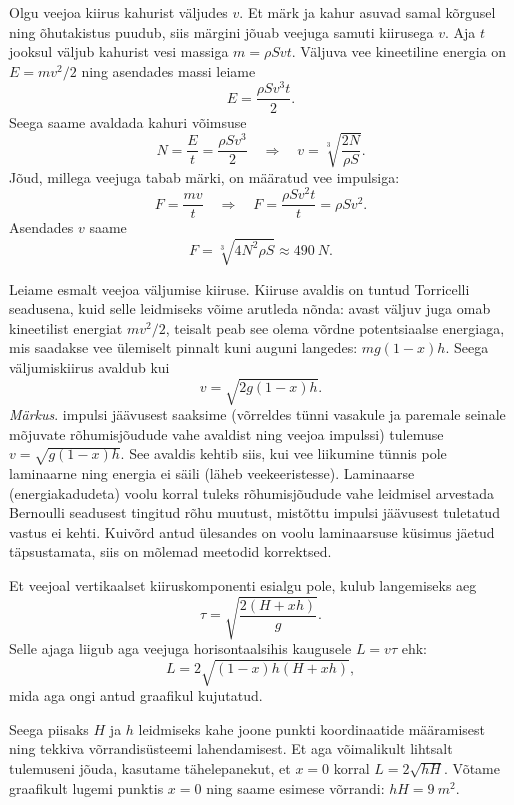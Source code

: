 \documentclass[10pt, twoside]{article}
\begin{document}
{%

\solu
Olgu veejoa kiirus kahurist väljudes $v$. Et märk ja kahur asuvad samal kõrgusel ning õhutakistus puudub, siis märgini jõuab veejuga samuti kiirusega $v$. Aja $t$ jooksul väljub kahurist vesi massiga $m = \rho Svt$. Väljuva vee kineetiline energia on $E = mv^2/2$ ning asendades massi leiame
\[
E = \frac{\rho Sv^3t}{2}.
\]
Seega saame avaldada kahuri võimsuse
\[
N=\frac{E}{t}=\frac{\rho S v^{3}}{2} \quad \Rightarrow \quad v=\sqrt[3]{\frac{2 N}{\rho S}}.
\]
Jõud, millega veejuga tabab märki, on määratud vee impulsiga:
\[
F=\frac{m v}{t} \quad \Rightarrow \quad F=\frac{\rho S v^{2} t}{t}=\rho S v^{2}.
\]
Asendades $v$ saame
\[
F=\sqrt[3]{4 N^{2} \rho S} \approx \SI{490}{N}.
\]
\probend
\bigskip


\solu
Leiame esmalt veejoa väljumise kiiruse. Kiiruse avaldis on tuntud Torricelli seadusena, kuid selle leidmiseks võime arutleda nõnda: avast väljuv juga omab kineetilist energiat $mv^2/2$, teisalt peab see olema võrdne potentsiaalse energiaga, mis saadakse vee ülemiselt pinnalt kuni auguni langedes: $mg(1 - x)h$. Seega väljumiskiirus avaldub kui
\[
v = \sqrt{2g(1 - x)h}.
\]
\emph{Märkus}. impulsi jäävusest saaksime (võrreldes tünni vasakule ja paremale seinale mõjuvate rõhumisjõudude vahe avaldist ning veejoa impulssi) tulemuse $v = \sqrt{g(1 - x)h}$. See avaldis kehtib siis, kui vee liikumine tünnis pole laminaarne ning energia ei säili (läheb veekeeristesse). Laminaarse (energiakadudeta) voolu korral tuleks rõhumisjõudude vahe leidmisel arvestada Bernoulli seadusest tingitud rõhu muutust, mistõttu impulsi jäävusest tuletatud vastus ei kehti. Kuivõrd antud ülesandes on voolu laminaarsuse küsimus jäetud täpsustamata, siis on mõlemad meetodid korrektsed.

Et veejoal vertikaalset kiiruskomponenti esialgu pole, kulub langemiseks aeg
\[
\tau = \sqrt{\frac{2(H+xh)}{g}}.
\]
Selle ajaga liigub aga veejuga horisontaalsihis kaugusele $L = v\tau$ ehk:
\[
L=2 \sqrt{(1-x) h(H+x h)},
\]
mida aga ongi antud graafikul kujutatud.

Seega piisaks $H$ ja $h$ leidmiseks kahe joone punkti koordinaatide määramisest ning tekkiva võrrandisüsteemi lahendamisest. Et aga võimalikult lihtsalt tulemuseni jõuda, kasutame tähelepanekut, et $x = 0$ korral $L = 2\sqrt{hH}$. Võtame graafikult lugemi punktis $x = 0$ ning saame esimese võrrandi: $hH = \SI{9}{m^2}$.

}
\end{document}
